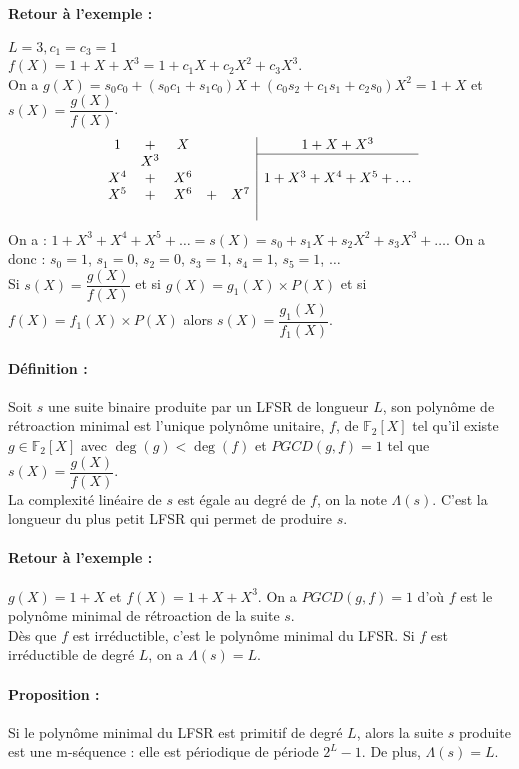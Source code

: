 \documentclass[12pt,a4paper]{report}
\begin{document}
\paragraph{Retour à l'exemple :} $L=3, c_1=c_3=1$\\
$f(X) = 1+X+X^3 = 1+c_1X+c_2 X^2 +c_3 X^3 $.\\
 On a $g(X) = s_0c_0 + (s_0c_1+s_1c_0)X + (c_0s_2 +c_1s_1+c_2s_0)X^2 = 1+X $ et $s(X) = \dfrac{g(X)}{f(X)}$.
$$ \begin{array}{ccccc|c} 
1 &+& X & & & 1+X+X^3\\\cline{6-6}
& X^3 & & & &  \\
X^4& + & X^6 & & & 1+X^3+X^4+X^5+\ldots\\
X^5 & + & X^6 & + & X^7 &  \\
 & & & &  \\
\end{array}$$
On a : $ 1+X^3+X^4+X^5+\ldots = s(X) =s_0+s_1X +s_2X^2 +s_3X^3 + \ldots $. On a donc : $s_0 = 1$, $s_1=0$, $s_2=0$, $ s_3=1$, $s_4=1$, $ s_5=1$, $\ldots$\\
Si $s(X) = \dfrac{g(X)}{f(X)}$ et si $g(X)=g_1(X) \times P(X)$ et si $f(X) = f_1(X)\times P(X)$ alors $s(X) = \dfrac{g_1(X)}{f_1(X)}$.
\paragraph{Définition :\\}
Soit $s$ une suite binaire produite par un LFSR de longueur $L$, son polynôme de rétroaction minimal est l'unique polynôme unitaire, $f$, de $\mathbb{F}_2[X]$ tel qu'il existe $g \in \mathbb{F}_2[X]$ avec $ \deg(g) < \deg(f)$ et $PGCD(g,f) = 1$ tel que $s(X) = \dfrac{g(X)}{f(X)}$.\\
La complexité linéaire de $s$ est égale au degré de $f$, on la note $\Lambda(s)$. C'est la longueur du plus petit LFSR qui permet de produire $s$.
\paragraph{Retour à l'exemple :\\}
$g(X) = 1+X$ et $f(X)= 1+X+X^3$. On a $PGCD(g,f)= 1$ d'où $f$ est le polynôme minimal de rétroaction de la suite $s$.\\

Dès que $f$ est irréductible, c'est le polynôme minimal du LFSR. Si $f$ est irréductible de degré $L$, on a $\Lambda(s)=L$.
\paragraph{Proposition :\\}
Si le polynôme minimal du LFSR est primitif de degré $L$, alors la suite $s$ produite est une m-séquence : elle est périodique de période $2^L-1$. De plus, $\Lambda(s) =L$.
\end{document}

